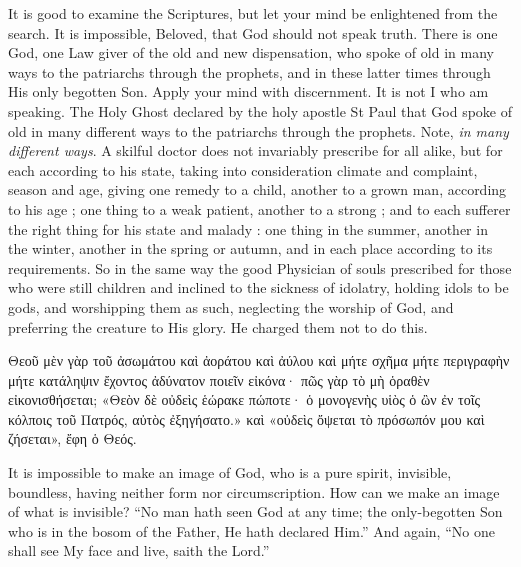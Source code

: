 \documentclass[10pt]{book}
\newcommand{\switchgreek}[1][]{\selectlanguage{polutonikogreek} \switchcolumn*[#1]}
\newcommand{\switchenglish}{\selectlanguage{english} \switchcolumn}
\begin{document}
\begin{paracol}{2}
It is good to examine the Scriptures, but 
let your mind be enlightened from the search. 
It is impossible, Beloved, that God should not 
speak truth. There is one God, one Law 
giver of the old and new dispensation, who 
spoke of old in many ways to the patriarchs 
through the prophets, and in these latter times 
through His only begotten Son. Apply your 
mind with discernment. It is not I who am 
speaking. The Holy Ghost declared by the 
holy apostle St Paul that God spoke of old 
in many different ways to the patriarchs 
through the prophets. Note, \emph{in many different ways}.
A skilful doctor does not invariably 
prescribe for all alike, but for each according 
to his state, taking into consideration climate 
and complaint, season and age, giving one 
remedy to a child, another to a grown man, 
according to his age ; one thing to a weak 
patient, another to a strong ; and to each 
sufferer the right thing for his state and 
malady : one thing in the summer, another in 
the winter, another in the spring or autumn, 
and in each place according to its requirements. 
So in the same way the good Physician of 
souls prescribed for those who were still 
children and inclined to the sickness of idolatry, 
holding idols to be gods, and worshipping 
them as such, neglecting the worship of God, 
and preferring the creature to His glory. 
He charged them not to do this. 

\switchgreek

Θεοῦ μὲν γὰρ τοῦ ἀσωμάτου καὶ ἀοράτου καὶ ἀύλου
καὶ μήτε σχῆμα μήτε περιγραφὴν μήτε
κατάληψιν ἔχοντος ἀδύνατον ποιεῖν εἰκόνα· πῶς γὰρ τὸ μὴ ὁραθὲν
εἰκονισθήσεται; «Θεὸν δὲ οὐδεὶς ἑώρακε πώποτε· ὁ μονογενὴς υἱὸς ὁ ὢν ἐν τοῖς
κόλποις τοῦ Πατρός, αὐτὸς ἐξηγήσατο.» καὶ «οὐδεὶς ὄψεται τὸ πρόσωπόν μου καὶ
ζήσεται», ἔφη ὁ Θεός.

\switchenglish

It is impossible to make an image of God, 
who is a pure spirit, invisible, boundless, having 
neither form nor circumscription. How can 
we make an image of what is invisible? ``No 
man hath seen God at any time; the only-begotten
Son who is in the bosom of the 
Father, He hath declared Him.'' And again, 
``No one shall see My face and live, saith the Lord.'' 

\switchgreek


\end{paracol}
\end{document}
